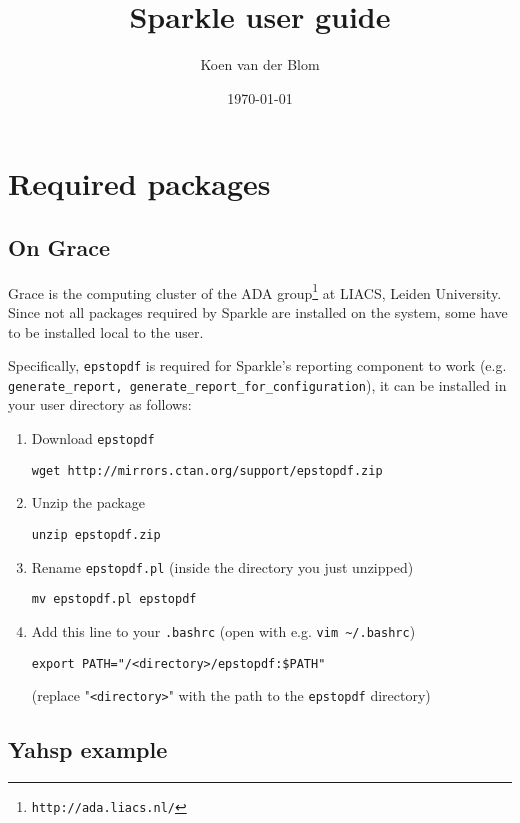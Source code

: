 \documentclass{article}
\title{Sparkle user guide}
\author{Koen van der Blom}
\date{\today}
\begin{document}
\maketitle

\section{Required packages}

\subsection{On Grace}

Grace is the computing cluster of the ADA group\footnote{\texttt{http://ada.liacs.nl/}} at LIACS, Leiden University. Since not all packages required by Sparkle are installed on the system, some have to be installed local to the user.

Specifically, \texttt{epstopdf} is required for Sparkle's reporting component to work (e.g. \texttt{generate\_report, generate\_report\_for\_configuration}), it can be installed in your user directory as follows:

\begin{enumerate}
  \item Download \texttt{epstopdf}

  \texttt{wget http://mirrors.ctan.org/support/epstopdf.zip}

  \item Unzip the package

  \texttt{unzip epstopdf.zip}

  \item Rename \texttt{epstopdf.pl} (inside the directory you just unzipped)

  \texttt{mv epstopdf.pl epstopdf}

  \item Add this line to your \texttt{.bashrc} (open with e.g. \texttt{vim \~{}/.bashrc})

  \texttt{export PATH="/<directory>/epstopdf:\$PATH"}

  (replace "\texttt{<directory>}" with the path to the \texttt{epstopdf} directory)
\end{enumerate}

\subsection{Yahsp example}
\end{document}
